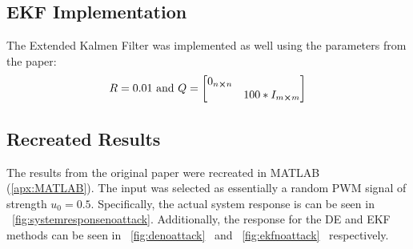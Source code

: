 \documentclass[]{article}
\begin{document}
\subsection{EKF Implementation}
The Extended Kalmen Filter was implemented as well using the parameters from the paper:
\begin{displaymath}
	R = 0.01 \text{ and } Q = \mqty[0_{n\cross n} & \\ & 100 * I_{m \cross m}]
\end{displaymath}






\subsection{Recreated Results}
The results from the original paper were recreated in MATLAB (\appendixname \ref{apx:MATLAB}). The input was selected as essentially a random PWM signal of strength $u_0 = 0.5$.
Specifically, the actual system response is can be seen in \figurename \ \ref{fig:systemresponsenoattack}. Additionally, the response for the DE and EKF methods can be seen in \figurename \ \ref{fig:denoattack} \ and \figurename \ \ref{fig:ekfnoattack} \ respectively.
\end{document}
